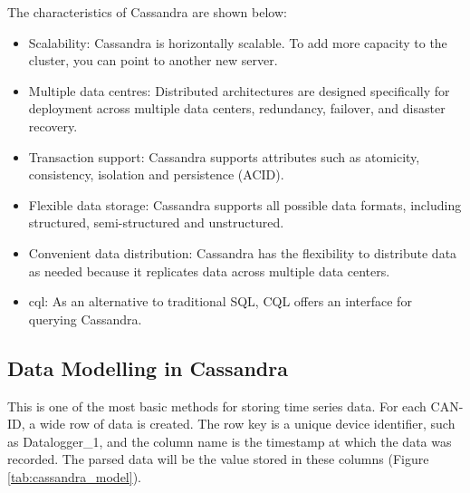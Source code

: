 The characteristics of Cassandra are shown below:
\begin{itemize}
    \item Scalability: Cassandra is horizontally scalable. To add more capacity to the cluster, you can point to another new server.
    \item Multiple data centres: Distributed architectures are designed specifically for deployment across multiple data centers, redundancy, failover, and disaster recovery.
    \item Transaction support: Cassandra supports attributes such as atomicity, consistency, isolation and persistence (ACID).
    \item Flexible data storage: Cassandra supports all possible data formats, including structured, semi-structured and unstructured.
    \item Convenient data distribution: Cassandra has the flexibility to distribute data as needed because it replicates data across multiple data centers.
    \item \ac{cql}: As an alternative to traditional SQL, CQL offers an interface for querying Cassandra\cite{cassandra_wikipedia_2021}. 
\end{itemize}

\subsection{Data Modelling in Cassandra}

This is one of the most basic methods for storing time series data. For each CAN-ID, a wide row of data is created. The row key is a unique device identifier, such as Datalogger\_1, and the column name is the timestamp at which the data was recorded. The parsed data will be the value stored in these columns (Figure \ref{tab:cassandra_model}).

\begin{table}[hbt!]
\centering
{}
\caption{Storing the data for Motor\_12 per row}
\label{tab:cassandra_model}
\end{table}

